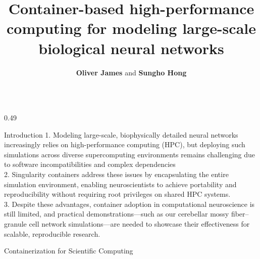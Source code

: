 \documentclass{beamer}
\begin{document}

\title[]{\Huge Container-based high-performance computing for modeling large-scale biological neural networks  \\[-0.1 in]}
\author[]{\LARGE \textbf{Oliver James} and \textbf{Sungho Hong} \\[-0.1 in] }
\date{}



\begin{frame}
\vspace{-0.3 in}
\maketitle

 \begin{columns}
        \begin{column}{0.49\linewidth}
        \vspace{0 in}
            \begin{block}{\LARGE Introduction}
            \justifying
        {\large 1. Modeling large-scale, biophysically detailed neural networks increasingly relies on high-performance computing (HPC), but deploying such simulations across diverse supercomputing environments remains challenging due to software incompatibilities and complex dependencies \\[0.3 cm]
2. Singularity containers address these issues by encapsulating the entire simulation environment, enabling neuroscientists to achieve portability and reproducibility without requiring root privileges on shared HPC systems.\\[0.3 cm]
3. Despite these advantages, container adoption in computational neuroscience is still limited, and practical demonstrations—such as our cerebellar mossy fiber–granule cell network simulations—are needed to showcase their effectiveness for scalable, reproducible research.
               }
            \end{block}
            \vspace{0.5cm}
            \begin{block}{\LARGE Containerization for Scientific Computing }
            \centering
            \vspace{0.5cm}
            \end{block}


\end{column}
\end{columns}
\end{frame}
\end{document}
